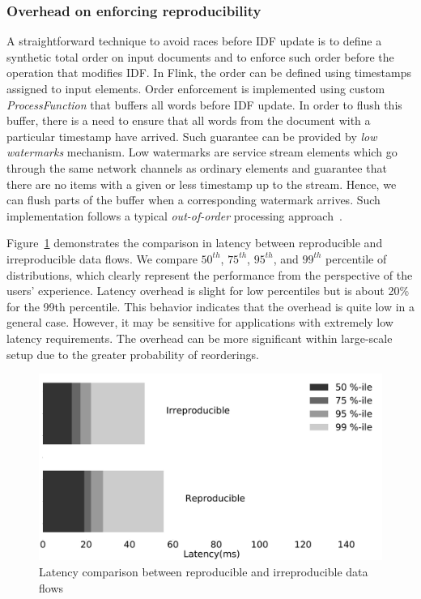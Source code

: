\subsubsection{Overhead on enforcing reproducibility}

A straightforward technique to avoid races before IDF update is to define a synthetic total order on input documents and to enforce such order before the operation that modifies IDF. In Flink, the order can be defined using timestamps assigned to input elements. Order enforcement is implemented using custom {\it ProcessFunction} that buffers all words before IDF update. In order to flush this buffer, there is a need to ensure that all words from the document with a particular timestamp have arrived. Such guarantee can be provided by {\em low watermarks} mechanism. Low watermarks are service stream elements which go through the same network channels as ordinary elements and guarantee that there are no items with a given or less timestamp up to the stream. Hence, we can flush parts of the buffer when a corresponding watermark arrives. Such implementation follows a typical {\em out-of-order} processing approach~\cite{Li:2008:OPN:1453856.1453890}.

Figure~\ref{reproducibility} demonstrates the comparison in latency between reproducible and irreproducible data flows. We compare $50^{th}$, $75^{th}$, $95^{th}$, and $99^{th}$ percentile of distributions, which clearly represent the performance from the perspective of the users' experience. Latency overhead is slight for low percentiles but is about 20\% for the 99th percentile. This behavior indicates that the overhead is quite low in a general case. However, it may be sensitive for applications with extremely low latency requirements. The overhead can be more significant within large-scale setup due to the greater probability of reorderings.

\begin{figure}[htbp]
  \centering
  \includegraphics[scale=0.1]{pics/reproducibility}
  \caption{Latency comparison between reproducible and irreproducible data flows}
  \label {reproducibility}
\end{figure}

